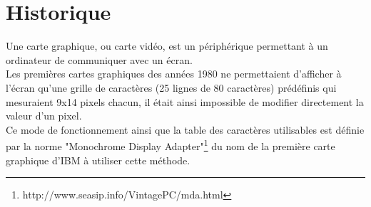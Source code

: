 \section{Historique}

Une carte graphique, ou carte vidéo, est un périphérique permettant à un ordinateur de communiquer 
avec un écran.\\
Les premières cartes graphiques des années 1980 ne permettaient d'afficher à l'écran qu'une grille de caractères 
(25 lignes de 80 caractères)
prédéfinis qui mesuraient 9x14 pixels chacun, il était ainsi impossible de modifier directement la valeur d'un pixel.\\
Ce mode de fonctionnement ainsi que la table des caractères utilisables est définie par la norme "Monochrome Display Adapter"\footnote{http://www.seasip.info/VintagePC/mda.html}
du nom de la première carte graphique d'IBM à utiliser cette méthode.
